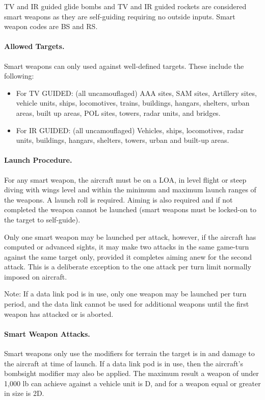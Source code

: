 
\label{rule:smart-weapons}

TV and IR guided glide bombs and TV and IR guided rockets are considered smart weapons as they are self-guiding requiring no outside inputs. Smart weapon codes are BS and RS.  

\paragraph{Allowed Targets.} Smart weapons can only used against well-defined targets. These include the following:

\begin{itemize}
    \item For TV GUIDED: (all uncamouflaged) AAA sites, SAM sites, Artillery sites, vehicle units, ships, locomotives, trains, buildings, hangars, shelters, urban areas, built up areas, POL sites, towers, radar units, and bridges.

    \item For IR GUIDED: (all uncamouflaged) Vehicles, ships, locomotives, radar units, buildings, hangars, shelters, towers, urban and built-up areas.
\end{itemize}

\paragraph{Launch Procedure.} For any smart weapon, the aircraft must be on a LOA, in level flight or steep diving with wings level and within the minimum and maximum launch ranges of the weapons. A launch roll is required. Aiming is also required and if not completed the weapon cannot be launched (smart weapons must be locked-on to the target to self-guide).

Only one smart weapon may be launched per attack, however, if the aircraft has computed or advanced sights, it may make two attacks in the same game-turn against the same target only, provided it completes aiming anew for the second attack. This is a deliberate exception to the one attack per turn limit normally imposed on aircraft.

Note: If a data link pod is in use, only one weapon may be launched per turn period, and the data link cannot be used for additional weapons until the first weapon has attacked or is aborted.

\paragraph{Smart Weapon Attacks.} Smart weapons only use the modifiers for terrain the target is in and damage to the aircraft at time of launch. If a data link pod is in use, then the aircraft's bombsight modifier may also be applied. The maximum result a weapon of under 1,000 lb can achieve against a vehicle unit is D, and for a weapon equal or greater in size is 2D.

